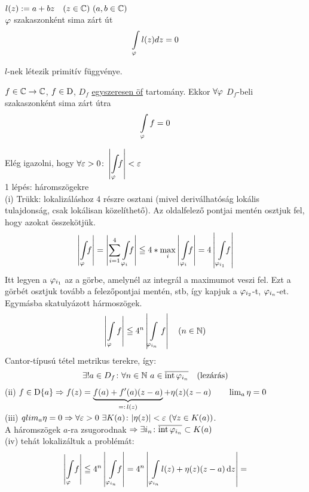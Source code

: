 \begin{te}
  $l(z) := a + bz\quad(z\in \C)\ (a,b\in\C)$\\
  $\varphi$ szakaszonként sima zárt út
  \[ \di\Int_\vfi l(z)dz = 0\]
\end{te}
\begin{biz} $l$-nek létezik primitív függvénye.
\end{biz}

\begin{te}$f\in\mathbb{C}\to\mathbb{C}$, $f\in\operatorname{D}$, $D_f$ \underline{egyszeresen öf} tartomány. Ekkor $\forall
  \varphi$ $D_f$-beli szakaszonként sima zárt útra
  \[\di\Int_\vfi f = 0\]
\end{te}

\begin{biz}
  Elég igazolni, hogy $\forall\epsilon>0\colon \left|\di\Int_\vfi\!\! f\right| < \epsilon$\\
  1 lépés: háromszögekre\\
  (i) Trükk: lokalizáláshoz 4 részre osztani (mivel deriválhatóság lokális tulajdonság, csak lokálisan közelíthető). Az
  oldalfelező pontjai mentén osztjuk fel, hogy azokat összekötjük.
  \[\left|\Int_\vfi\!\! f \right| = \left|\sum_{i=1}^4 \Int_{\vfi_i}\!\!f\right| \leqq 4* \max_i
  \left|\,\Int_{\vfi_i}\!\! f\right| =  4  \left|\,\Int_{\vfi_{i_1}}\!\! f\right|\]
  Itt legyen a $\varphi_{i_1}$ az a görbe, amelynél az integrál a maximumot veszi fel. Ezt a görbét osztjuk tovább a
  felezőpontjai mentén, stb, így kapjuk a  $\varphi_{i_2}$-t,  $\varphi_{i_n}$-et.\\
  Egymásba skatulyázott hármoszögek.
   \[\left|\Int_\vfi f \right| \leqq 4^n \left|\Int_{\vfi_{i_n}}f\right|\quad (n\in \N)\]
   Cantor-típusú tétel metrikus terekre, így:
   \[ \exists! a\in D_f\colon \forall n \in \N\ a\in\overline{\intG\vfi_{i_n}}\quad\text{(lezárás)}\]
   (ii) $f\in \operatorname{D}\{a\} \Rightarrow f(z) = \underbrace{f(a) + f'(a)(z-a)}_{=:\,l(z)}+\eta(z)(z-a)\qquad \lim_a\eta=0$\\
   (iii) $qlim_a\eta=0\Rightarrow \forall \varepsilon > 0\  \exists K(a)\colon |\eta(z)|<\varepsilon\ (\forall z \in K(a))$.\\
   A háromszögek $a$-ra zsugorodnak $\Rightarrow \exists i_n\colon \overline{ \operatorname{int}\varphi_{i_n}}\subset K(a)$\\
   (iv) tehát lokalizáltuk a problémát: 
   \begin{gather*}\di     
     \left|\Int_\vfi\!f\right| \leqq 4^n\left|\,\Int_{\vfi_{i_n}}\!\!f\right| = 4^n \left|\,\Int_{\vfi_{i_n}}\! l(z)
     +\eta(z) (z-a)\diff z\right| = \\

\end{gather*}
\end{biz}
